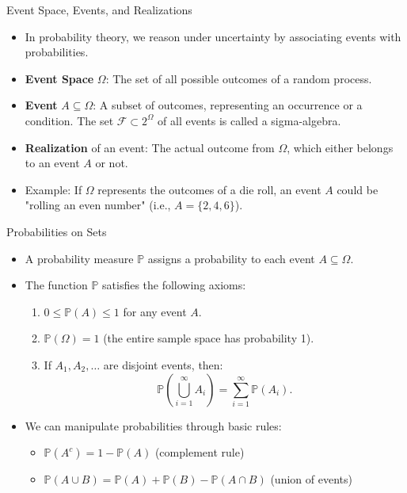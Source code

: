 \documentclass{beamer}
\renewcommand{\P}{\mathbb{P}}
\newcommand{\1}{\mathbf{1}}
\begin{document}
\begin{frame}{Event Space, Events, and Realizations}
  \begin{itemize}
    \item In probability theory, we reason under uncertainty by associating events with probabilities.
    \item \textbf{Event Space} \( \Omega \): The set of all possible outcomes of a random process.
    \item \textbf{Event} \( A \subseteq \Omega \): A subset of outcomes, representing an occurrence or a condition. The set $\mathcal{F} \subset 2^{\Omega}$ of all events is called a sigma-algebra.
    \item \textbf{Realization} of an event: The actual outcome from \( \Omega \), which either belongs to an event \( A \) or not.
    \item Example: If \( \Omega \) represents the outcomes of a die roll, an event \( A \) could be "rolling an even number" (i.e., \( A = \{2, 4, 6\} \)).
  \end{itemize}
\end{frame}

\begin{frame}{Probabilities on Sets}
  \begin{itemize}
    \item A probability measure \( \P \) assigns a probability to each event \( A \subseteq \Omega \).
    \item The function \( \P \) satisfies the following axioms:
      \begin{enumerate}
        \item \( 0 \leq \P(A) \leq 1 \) for any event \( A \).
        \item \( \P(\Omega) = 1 \) (the entire sample space has probability 1).
        \item If \( A_1, A_2, \dots \) are disjoint events, then:
          \[
            \P\left(\bigcup_{i=1}^{\infty} A_i\right) = \sum_{i=1}^{\infty} \P(A_i).
          \]
      \end{enumerate}
    \item We can manipulate probabilities through basic rules:
      \begin{itemize}
        \item \( \P(A^c) = 1 - \P(A) \) (complement rule)
        \item \( \P(A \cup B) = \P(A) + \P(B) - \P(A \cap B) \) (union of events)
      \end{itemize}
  \end{itemize}
\end{frame}
\end{document}
